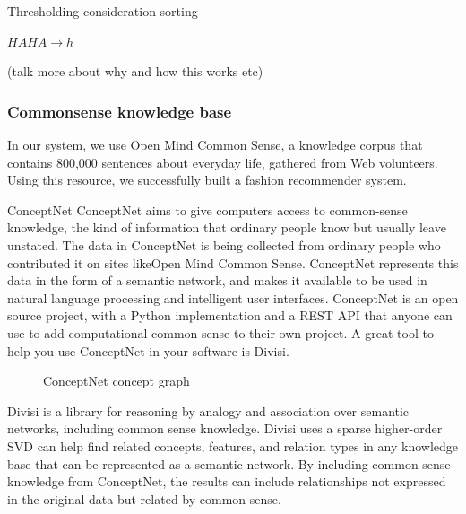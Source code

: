 \documentclass[11pt,twocolumn]{article}
\begin{document}
\begin{algorithm}
\caption{Thresholding consideration sorting}
\label{tcs}
\begin{algorithmic}
\STATE $HAHA \rightarrow h$
\end{algorithmic}
\end{algorithm}

(talk more about why and how this works etc)


\subsubsection{Commonsense knowledge base}
In our system, we use Open Mind Common Sense, a knowledge corpus that contains 800,000 sentences about everyday life, gathered from Web volunteers. Using this resource, we successfully built a fashion recommender system.

{\large ConceptNet}
ConceptNet aims to give computers access to common-sense knowledge, the kind of information that ordinary people know but usually leave unstated.
The data in ConceptNet is being collected from ordinary people who contributed it on sites likeOpen Mind Common Sense. ConceptNet represents this data in the form of a semantic network, and makes it available to be used in natural language processing and intelligent user interfaces.
ConceptNet is an open source project, with a Python implementation and a REST API that anyone can use to add computational common sense to their own project. A great tool to help you use ConceptNet in your software is Divisi.

\begin{figure}[h!t]
\caption{ConceptNet concept graph}
\label{graph}
\end{figure}


{\large Divisi}
is a library for reasoning by analogy and association over semantic networks, including common sense knowledge.
Divisi uses a sparse higher-order SVD can help find related concepts, features, and relation types in any knowledge base that can be represented as a semantic network. By including common sense knowledge from ConceptNet, the results can include relationships not expressed in the original data but related by common sense.
\end{document}
